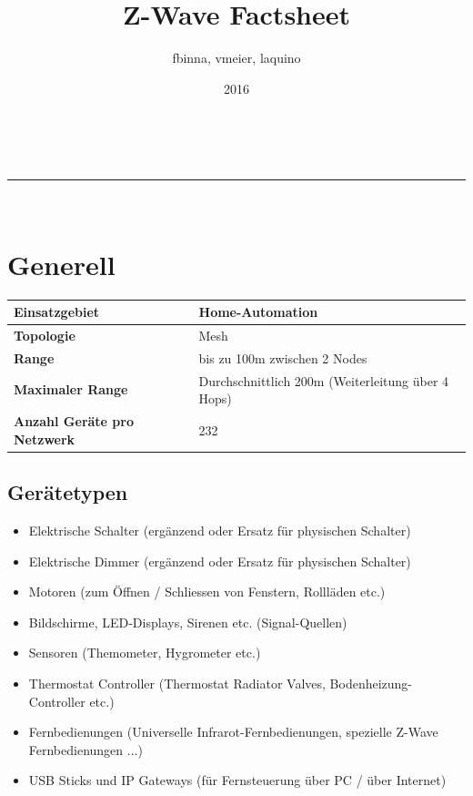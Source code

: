 \documentclass[a4paper,11pt]{article}
\makeatletter
\newcommand{\linia}{\rule{\linewidth}{0.5pt}}
\renewcommand{\maketitle}{
\begin{center}
\vspace{2ex}
{\huge \textsc{\@title}}
\vspace{1ex}
\\
\linia\\
\@author \hfill \@date
\vspace{4ex}
\end{center}
}
\makeatother
\begin{document}
\title{Z-Wave Factsheet}

\author{fbinna, vmeier, laquino}

\date{2016}

\maketitle

\section*{Generell}
\begin{tabular}{| p{3.5cm} | p{10cm} |}
	\hline
	\textbf{Einsatzgebiet} & Home-Automation \\\hline
	\textbf{Topologie} & Mesh \\\hline
	\textbf{Range} & bis zu 100m zwischen 2 Nodes \\\hline
	\textbf{Maximaler Range} & Durchschnittlich 200m (Weiterleitung über 4 Hops) \\\hline
	\textbf{Anzahl Geräte pro Netzwerk} & 232 \\\hline
	
\end{tabular}

\subsection*{Gerätetypen}
\begin{itemize}
 \item Elektrische Schalter (ergänzend oder Ersatz für physischen Schalter)
 \item Elektrische Dimmer (ergänzend oder Ersatz für physischen Schalter)
 \item Motoren (zum Öffnen / Schliessen von Fenstern, Rollläden etc.)
 \item Bildschirme, LED-Displays, Sirenen etc. (Signal-Quellen)
 \item Sensoren (Themometer, Hygrometer etc.)
 \item Thermostat Controller (Thermostat Radiator Valves, Bodenheizung-Controller etc.)
 \item Fernbedienungen (Universelle Infrarot-Fernbedienungen, spezielle Z-Wave Fernbedienungen ...)
 \item USB Sticks und IP Gateways (für Fernsteuerung über PC / über Internet)
\end{itemize}
\end{document}
